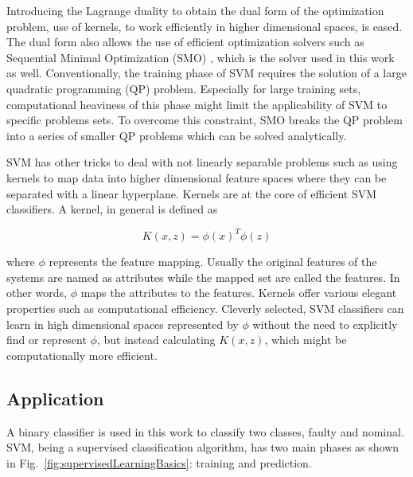 Introducing the Lagrange duality to obtain the dual form of the optimization problem, use of kernels, to work efficiently in higher dimensional spaces, is eased. %
The dual form also allows the use of efficient optimization solvers such as Sequential Minimal Optimization (SMO)  \cite{platt1998sequential}, which is the solver used in this work as well. Conventionally, the training phase of SVM requires the solution of a large quadratic programming (QP) problem. Especially for large training sets, computational heaviness of this phase might limit the applicability of SVM to specific problems sets. To overcome this constraint, SMO breaks the QP problem into a series of smaller QP problems which can be solved analytically. 


SVM has other tricks to deal with not linearly separable problems such as using kernels to map data into higher dimensional feature spaces where they can be separated with a linear hyperplane. Kernels are at the core of efficient SVM classifiers. A kernel, in general is defined as

\begin{equation}
K (x,z) = {\phi(x)}^T \phi(z)
\end{equation}

where $\phi$ represents the feature mapping. Usually the original features of the systems are named as attributes while the mapped set are called the features. In other words, $\phi$ maps the attributes to the features. Kernels offer various elegant properties such as computational efficiency. 
Cleverly selected, SVM classifiers can learn in high dimensional spaces represented by $\phi$ without the need to explicitly find or represent $\phi$, but instead calculating $K(x,z)$, which might be computationally more efficient. 

 
\subsection{Application}


A binary classifier is used in this work to classify two classes, faulty and nominal. 
SVM, being a supervised classification algorithm, has two main phases as shown in Fig.~\ref{fig:supervisedLearningBasics}: training and prediction. 


